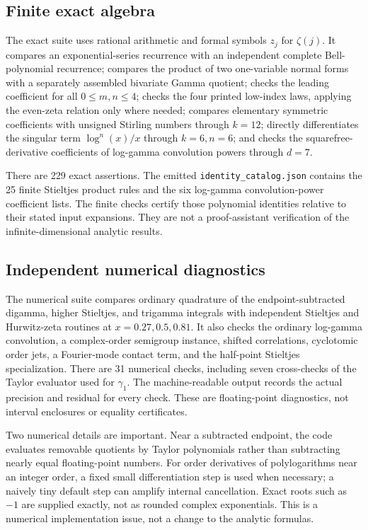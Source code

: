 \documentclass[11pt]{article}
\numberwithin{equation}{section}
\theoremstyle{definition}
\theoremstyle{remark}
\begin{document}
\subsection{Finite exact algebra}
The exact suite uses rational arithmetic and formal symbols $z_j$ for
$\zeta(j)$. It compares an exponential-series recurrence with an
independent complete Bell-polynomial recurrence; compares the product
of two one-variable normal forms with a separately assembled bivariate
Gamma quotient; checks the leading coefficient for all $0\le m,n\le4$;
checks the four printed low-index laws, applying the even-zeta relation
only where needed; compares elementary symmetric coefficients with
unsigned Stirling numbers through $k=12$; directly differentiates the
singular term $\log^n(x)/x$ through $k=6,n=6$; and checks the
squarefree-derivative coefficients of log-gamma convolution powers
through $d=7$.

There are 229 exact assertions. The emitted
\texttt{identity\_catalog.json} contains the 25 finite Stieltjes product
rules and the six log-gamma convolution-power coefficient lists. The
finite checks certify those polynomial identities relative to their
stated input expansions. They are not a proof-assistant verification of
the infinite-dimensional analytic results.

\subsection{Independent numerical diagnostics}
The numerical suite compares ordinary quadrature of the endpoint-subtracted
digamma, higher Stieltjes, and trigamma integrals with independent Stieltjes and Hurwitz-zeta
routines at $x=0.27,0.5,0.81$. It also checks the ordinary log-gamma
convolution, a complex-order semigroup instance, shifted correlations,
cyclotomic order jets, a Fourier-mode contact term, and the half-point
Stieltjes specialization. There are 31 numerical checks, including seven cross-checks of the Taylor evaluator used for $\gamma_1$. The machine-readable output records the actual precision and residual for every check. These are floating-point
diagnostics, not interval enclosures or equality certificates.

Two numerical details are important. Near a subtracted endpoint, the
code evaluates removable quotients by Taylor polynomials rather than
subtracting nearly equal floating-point numbers. For order derivatives
of polylogarithms near an integer order, a fixed small differentiation
step is used when necessary; a naively tiny default step can amplify
internal cancellation. Exact roots such as $-1$ are supplied exactly,
not as rounded complex exponentials. This is a numerical implementation
issue, not a change to the analytic formulas.
\end{document}

